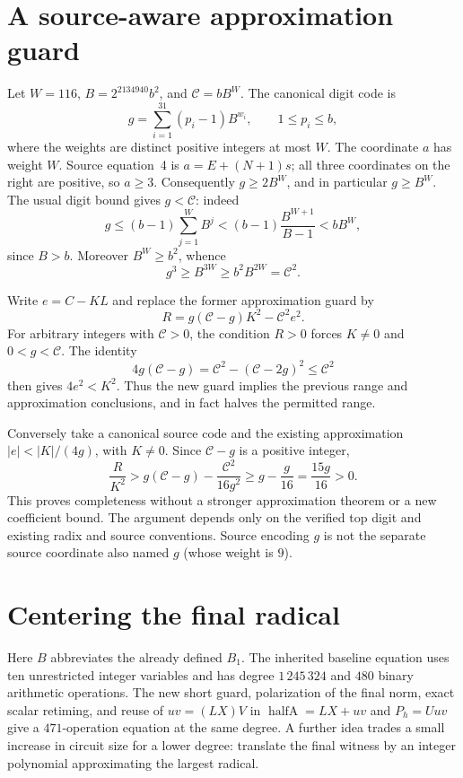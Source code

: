 \documentclass[11pt]{article}
\begin{document}
\section{A source-aware approximation guard}
Let $W=116$, $B=2^{2134940}b^2$, and $\mathcal C=bB^W$.
The canonical digit code is
\[
 g=\sum_{i=1}^{31}(p_i-1)B^{w_i},\qquad
 1\le p_i\le b,
\]
where the weights are distinct positive integers at most $W$.
The coordinate $a$ has weight $W$. Source equation~4 is
$a=E+(N+1)s$; all three coordinates on the right are positive, so
$a\ge3$. Consequently $g\ge2B^W$, and in particular $g\ge B^W$.
The usual digit bound gives $g<\mathcal C$: indeed
\[
 g\le(b-1)\sum_{j=1}^{W}B^j
 < (b-1)\frac{B^{W+1}}{B-1}<bB^W,
\]
since $B>b$. Moreover $B^W\ge b^2$, whence
\[
 g^3\ge B^{3W}\ge b^2B^{2W}=\mathcal C^2.
\]

Write $e=C-KL$ and replace the former approximation guard by
\[
 \boxed{\quad R=g(\mathcal C-g)K^2-\mathcal C^2e^2.\quad}
\]
For arbitrary integers with $\mathcal C>0$, the condition $R>0$
forces $K\ne0$ and $0<g<\mathcal C$. The identity
\[
 4g(\mathcal C-g)=\mathcal C^2-(\mathcal C-2g)^2
 \le\mathcal C^2
\]
then gives $4e^2<K^2$. Thus the new guard implies the previous
range and approximation conclusions, and in fact halves the permitted range.

Conversely take a canonical source code and the existing approximation
$|e|<|K|/(4g)$, with $K\ne0$. Since $\mathcal C-g$ is a positive integer,
\[
 \frac{R}{K^2}
 >g(\mathcal C-g)-\frac{\mathcal C^2}{16g^2}
 \ge g-\frac{g}{16}=\frac{15g}{16}>0.
\]
This proves completeness without a stronger approximation theorem or a new
coefficient bound. The argument depends only on the verified top digit and
existing radix and source conventions. Source encoding $g$ is not the
separate source coordinate also named $g$ (whose weight is $9$).


\section{Centering the final radical}
Here $B$ abbreviates the already defined $B_1$.
The inherited baseline equation uses ten unrestricted integer variables and has degree
$1\,245\,324$ and $480$ binary arithmetic operations.  The new short guard,
polarization of the final norm, exact scalar retiming, and reuse of
$uv=(LX)V$ in $\operatorname{halfA}=LX+uv$
and $P_h=Uuv$ give a
$471$-operation equation at the same degree.  A further idea trades a small
increase in circuit size for a lower degree: translate the final witness by
an integer polynomial approximating the largest radical.
\end{document}
